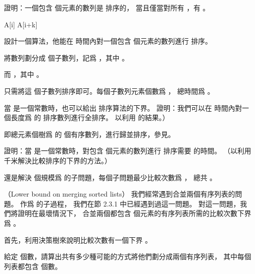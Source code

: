 \startitem
證明：一個包含  個元素的數列是  排序的，
當且僅當對所有 ，有 。
\stopitem

\startANSWER
\startformula\startmathalignment[n=1]
\NC {} \le {} \NR
\NC \Updownarrow \NR
\NC {} \le
      \NR
\NC \Updownarrow \NR
\NC {} \le {} \NR
\NC \Updownarrow \NR
\NC A[i] \le A[i+k] \NR
\stopmathalignment\stopformula
\stopANSWER

\startitem
設計一個算法，他能在  時間內對一個包含  個元素的數列進行  排序。
\stopitem

\startANSWER
將數列劃分成  個子數列，記爲 ，其中 。

而 ，其中 。

只需將這  個子數列排序即可。每個子數列元素個數爲 ，
總時間爲 。
\stopANSWER
\stopigBase

當  是一個常數時，也可以給出  排序算法的下界。
\startigBase[a,continue]
\startitem
證明：我們可以在  時間內對一個長度爲  的  排序數列進行全排序。
\hint 以利用 的結果。）
\stopitem

\startANSWER
即總元素個樹爲  的  個有序數列，進行歸並排序，參見。
\stopANSWER

\startitem
證明：當  是一個常數時，對包含  個元素的數列進行  排序需要  的時間。
（\hint 以利用千米解決比較排序的下界的方法。）
\stopitem

\startANSWER
還是解決  個規模爲  的子問題，每個子問題最少比較次數爲 ，
總共 。
\stopANSWER
\stopigBase
\stopPROBLEM

\startPROBLEM
（Lower bound on merging sorted lists）
我們經常遇到合並兩個有序列表的問題。
作爲  的子過程，
我們在節 2.3.1 中已經遇到過這一問題。
對這一問題，我們將證明在最壞情況下，
合並兩個都包含  個元素的有序列表所需的比較次數下界爲 。

首先，利用決策樹來說明比較次數有一個下界 。

\startigBase[a]
\startitem
給定  個數，請算出共有多少種可能的方式將他們劃分成兩個有序列表，
其中每個列表都包含  個數。
\stopitem

